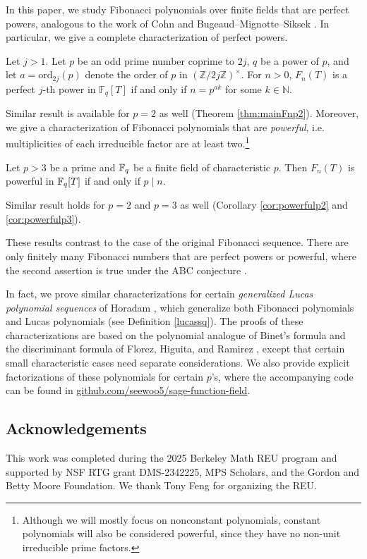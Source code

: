 In this paper, we study Fibonacci polynomials over finite fields that are perfect powers, analogous to the work of Cohn \cite{cohn1964square} and Bugeaud--Mignotte--Siksek \cite{bugeaud2006classical}.
In particular, we give a complete characterization of perfect powers.
\begin{theorem}
\label{thm:mainFn}
    Let $j > 1$. Let $p$ be an odd prime number coprime to \(2j\), $q$ be a power of $p$, and let $a = \mathrm{ord}_{2j}(p)$ denote the order of $p$ in $\left( \mathbb{Z}/2j\mathbb{Z} \right)^\times$. For $n > 0$, $F_n(T)$ is a perfect $j$-th power in $\mathbb{F}_q[T]$ if and only if $n = p^{ak}$ for some $k \in \mathbb{N}$.
\end{theorem}
Similar result is available for \(p = 2\) as well (Theorem \ref{thm:mainFnp2}).
Moreover, we give a characterization of Fibonacci polynomials that are \emph{powerful}, i.e. multiplicities of each irreducible factor are at least two.\footnote{Although we will mostly focus on nonconstant polynomials, constant polynomials will also be considered powerful, since they have no non-unit irreducible prime factors.}
\begin{theorem}
    \label{thm:mainFnpowerful}
    Let $p > 3$ be a prime and $\mathbb{F}_q$ be a finite field of characteristic $p$.
    Then \(F_n(T)\) is powerful in \(\mathbb{F}_q[T]\) if and only if \(p \mid n\).
\end{theorem}
Similar result holds for $p = 2$ and $p = 3$ as well (Corollary \ref{cor:powerfulp2} and \ref{cor:powerfulp3}).

These results contrast to the case of the original Fibonacci sequence.
There are only finitely many Fibonacci numbers that are perfect powers or powerful, where the second assertion is true under the ABC conjecture \cite{ribenboim1999abc,yabuta2007abc}.

In fact, we prove similar characterizations for certain \emph{generalized Lucas polynomial sequences} of Horadam \cite{Horadam1996}, which generalize both Fibonacci polynomials and Lucas polynomials (see Definition \ref{lucassq}).
The proofs of these characterizations are based on the polynomial analogue of Binet's formula and the discriminant formula of Florez, Higuita, and Ramirez \cite{florez2019resultant}, except that certain small characteristic cases need separate considerations.
We also provide explicit factorizations of these polynomials for certain $p$'s, where the accompanying code can be found in \href{https://github.com/seewoo5/sage-function-field}{github.com/seewoo5/sage-function-field}.

\subsection*{Acknowledgements}

This work was completed during the 2025 Berkeley Math REU program and supported by NSF RTG grant DMS-2342225, MPS Scholars, and the Gordon and Betty Moore Foundation.
We thank Tony Feng for organizing the REU.